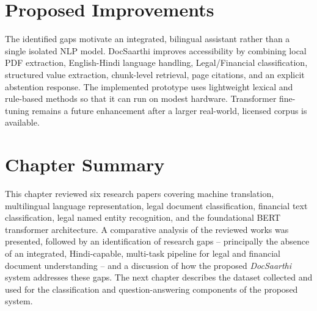 \section{Proposed Improvements}

The identified gaps motivate an integrated, bilingual assistant rather than a single isolated NLP model. DocSaarthi improves accessibility by combining local PDF extraction, English-Hindi language handling, Legal/Financial classification, structured value extraction, chunk-level retrieval, page citations, and an explicit abstention response. The implemented prototype uses lightweight lexical and rule-based methods so that it can run on modest hardware. Transformer fine-tuning remains a future enhancement after a larger real-world, licensed corpus is available.

\section*{Chapter Summary}

This chapter reviewed six research papers covering machine translation, multilingual language representation, legal document classification, financial text classification, legal named entity recognition, and the foundational BERT transformer architecture. A comparative analysis of the reviewed works was presented, followed by an identification of research gaps -- principally the absence of an integrated, Hindi-capable, multi-task pipeline for legal and financial document understanding -- and a discussion of how the proposed \textit{DocSaarthi} system addresses these gaps. The next chapter describes the dataset collected and used for the classification and question-answering components of the proposed system.
